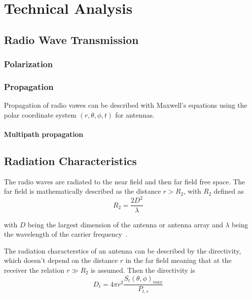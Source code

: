 \chapter{Technical Analysis}

\section{Radio Wave Transmission}

\subsection{Polarization}

\subsection{Propagation}
Propagation of radio vawes can be described with Maxwell's equations using the polar coordinate system $\left( r, \theta, \phi, t \right)$ for antennas. 




\subsubsection{Multipath propagation}


\section{Radiation Characteristics}
The radio waves are radiated to the near field and then far field free space. The far field is mathematically described as the distance $r>R_2$, with $R_2$ defined as
\begin{equation} \label{eq:far_field}
    R_2 = \frac{2 D^2}{\lambda}
\end{equation}

with $D$ being the largest dimension of the antenna or antenna array and $\lambda$ being the wavelength of the carrier frequency~\cite[p. 4]{ant_beam_form}.

The radiation characterstics of an antenna can be described by the directivity, which doesn't depend on the distance $r$ in the far field meaning that at the receiver the relation $r \gg  R_2$ is assumed. Then the directivity is
\begin{equation} \label{eq:directivity}
    D_t = 4 \pi r^2 \frac{S_t \left(\theta, \phi\right)_{max}}{P_{t,r}}
\end{equation}

